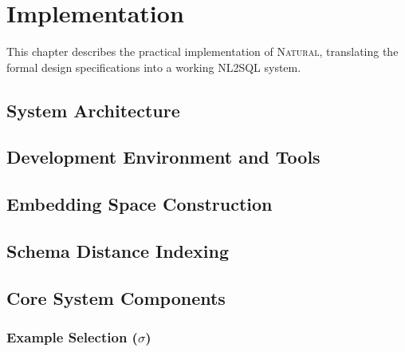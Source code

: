 \newpage

\section{Implementation}

This chapter describes the practical implementation of \textsc{Natural},
translating the formal design specifications into a working NL2SQL system.

\subsection{System Architecture}

\subsection{Development Environment and Tools}

\subsection{Embedding Space Construction}

\subsection{Schema Distance Indexing}

\subsection{Core System Components}

\subsubsection{Example Selection ($\sigma$)}

